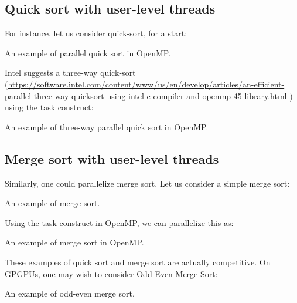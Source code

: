 \subsection{Quick sort with user-level threads}

For instance, let us consider quick-sort, for a start:

\begin{codebox}[breakable]{}
\footnotesize An example of parallel quick sort in OpenMP.
\tcblower
{}
\end{codebox}

Intel suggests a three-way quick-sort (\url{https://software.intel.com/content/www/us/en/develop/articles/an-efficient-parallel-three-way-quicksort-using-intel-c-compiler-and-openmp-45-library.html
}) using the task construct:

\begin{codebox}[breakable]{}
\footnotesize An example of three-way parallel quick sort in OpenMP.
\tcblower
{}
\end{codebox}

\subsection{Merge sort with user-level threads}

Similarly, one could parallelize merge sort. Let us consider a simple merge sort:

\begin{codebox}[breakable]{}
    \footnotesize An example of merge sort.
    \tcblower
    \end{codebox}

Using the task construct in OpenMP, we can parallelize this as:

    \begin{codebox}[breakable]{}
        \footnotesize An example of merge sort in OpenMP.
        \tcblower
        \end{codebox}

These examples of quick sort and merge sort are actually competitive. 
 On GPGPUs, one may wish to consider Odd-Even Merge Sort:

 \begin{codebox}[breakable]{}
    \footnotesize An example of odd-even merge sort.
    \tcblower
    \end{codebox}

